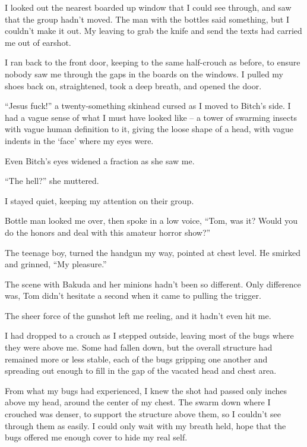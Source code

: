 I looked out the nearest boarded up window that I could see through, and saw that the group hadn't moved.  The man with the bottles said something, but I couldn't make it out.  My leaving to grab the knife and send the texts had carried me out of earshot.



I ran back to the front door, keeping to the same half-crouch as before, to ensure nobody saw me through the gaps in the boards on the windows.  I pulled my shoes back on, straightened, took a deep breath, and opened the door.



``Jesus fuck!'' a twenty-something skinhead cursed as I moved to Bitch's side.  I had a vague sense of what I must have looked like – a tower of swarming insects with vague human definition to it, giving the loose shape of a head, with vague indents in the `face' where my eyes were.



Even Bitch's eyes widened a fraction as she saw me.



``The hell?'' she muttered.



I stayed quiet, keeping my attention on their group.



Bottle man looked me over, then spoke in a low voice, ``Tom, was it?  Would you do the honors and deal with this amateur horror show?''



The teenage boy, turned the handgun my way, pointed at chest level.  He smirked and grinned, ``My pleasure.''



The scene with Bakuda and her minions hadn't been so different.  Only difference was, Tom didn't hesitate a second when it came to pulling the trigger.



The sheer force of the gunshot left me reeling, and it hadn't even hit me.



I had dropped to a crouch as I stepped outside, leaving most of the bugs where they were above me.  Some had fallen down, but the overall structure had remained more or less stable, each of the bugs gripping one another and spreading out enough to fill in the gap of the vacated head and chest area.



From what my bugs had experienced, I knew the shot had passed only inches above my head, around the center of my chest.  The swarm down where I crouched was denser, to support the structure above them, so I couldn't see through them as easily.  I could only wait with my breath held, hope that the bugs offered me enough cover to hide my real self.



